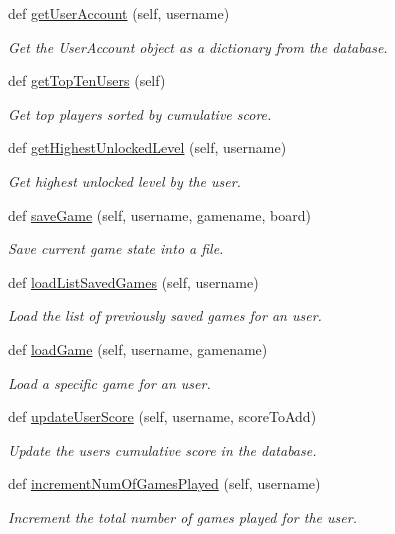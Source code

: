 \begin{DoxyCompactItemize}
\item 
def \hyperlink{classsrc_1_1database_1_1_database_a18158514f653442eb3ff7bb61b5f5213}{get\+User\+Account} (self, username)
\begin{DoxyCompactList}\small\item\em Get the User\+Account object as a dictionary from the database. \end{DoxyCompactList}\item 
def \hyperlink{classsrc_1_1database_1_1_database_a1e26b95f30986a81d197e118420d0865}{get\+Top\+Ten\+Users} (self)
\begin{DoxyCompactList}\small\item\em Get top players sorted by cumulative score. \end{DoxyCompactList}\item 
def \hyperlink{classsrc_1_1database_1_1_database_a20befecd8b13cac9a87e59b759a5406a}{get\+Highest\+Unlocked\+Level} (self, username)
\begin{DoxyCompactList}\small\item\em Get highest unlocked level by the user. \end{DoxyCompactList}\item 
def \hyperlink{classsrc_1_1database_1_1_database_a0910f9e8e11bf94dcf9a24489e6f4dde}{save\+Game} (self, username, gamename, board)
\begin{DoxyCompactList}\small\item\em Save current game state into a file. \end{DoxyCompactList}\item 
def \hyperlink{classsrc_1_1database_1_1_database_a8f48d5d1c090840389e7cbc556d635b5}{load\+List\+Saved\+Games} (self, username)
\begin{DoxyCompactList}\small\item\em Load the list of previously saved games for an user. \end{DoxyCompactList}\item 
def \hyperlink{classsrc_1_1database_1_1_database_abc4a7e44498f2e3ede0c52a43725526d}{load\+Game} (self, username, gamename)
\begin{DoxyCompactList}\small\item\em Load a specific game for an user. \end{DoxyCompactList}\item 
def \hyperlink{classsrc_1_1database_1_1_database_aea1e0de87f1e08cf83d31a2179cf0c12}{update\+User\+Score} (self, username, score\+To\+Add)
\begin{DoxyCompactList}\small\item\em Update the user\textquotesingle{}s cumulative score in the database. \end{DoxyCompactList}\item 
def \hyperlink{classsrc_1_1database_1_1_database_adf6d7572d1782bedb86e6880c24e8e9e}{increment\+Num\+Of\+Games\+Played} (self, username)
\begin{DoxyCompactList}\small\item\em Increment the total number of games played for the user. \end{DoxyCompactList}\end{DoxyCompactItemize}
